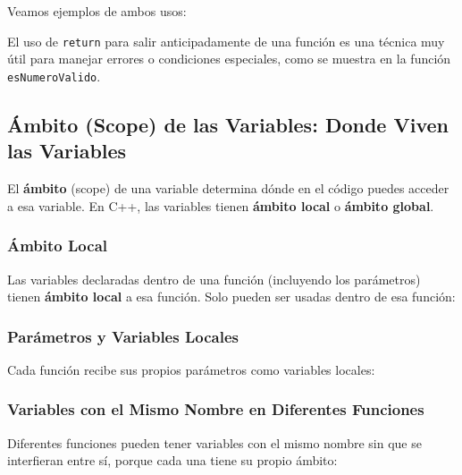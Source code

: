 Veamos ejemplos de ambos usos:



El uso de \texttt{return} para salir anticipadamente de una función es una técnica muy útil para manejar errores o condiciones especiales, como se muestra en la función \texttt{esNumeroValido}.

\subsection{Ámbito (Scope) de las Variables: Donde Viven las Variables}
\label{subsec:ambito_variables}

El \textbf{ámbito} (scope) de una variable determina dónde en el código puedes acceder a esa variable. En C++, las variables tienen \textbf{ámbito local} o \textbf{ámbito global}.

\subsubsection{Ámbito Local}
\label{subsubsec:ambito_local}

Las variables declaradas dentro de una función (incluyendo los parámetros) tienen \textbf{ámbito local} a esa función. Solo pueden ser usadas dentro de esa función:



\subsubsection{Parámetros y Variables Locales}
\label{subsubsec:parametros_variables_locales}

Cada función recibe sus propios parámetros como variables locales:



\subsubsection{Variables con el Mismo Nombre en Diferentes Funciones}
\label{subsubsec:variables_mismo_nombre}

Diferentes funciones pueden tener variables con el mismo nombre sin que se interfieran entre sí, porque cada una tiene su propio ámbito:

